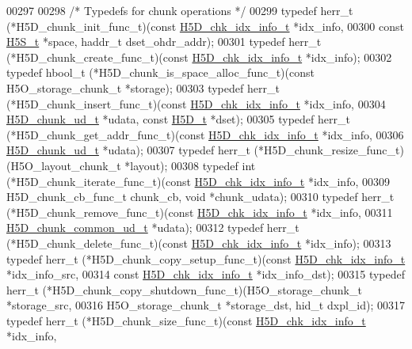 \begin{DoxyCode}
00297 
00298 \textcolor{comment}{/* Typedefs for chunk operations */}
00299 \textcolor{keyword}{typedef} herr\_t (*H5D\_chunk\_init\_func\_t)(\textcolor{keyword}{const} \hyperlink{struct_h5_d__chk__idx__info__t}{H5D\_chk\_idx\_info\_t} *idx\_info,
00300     \textcolor{keyword}{const} \hyperlink{struct_h5_s__t}{H5S\_t} *space, haddr\_t dset\_ohdr\_addr);
00301 \textcolor{keyword}{typedef} herr\_t (*H5D\_chunk\_create\_func\_t)(\textcolor{keyword}{const} \hyperlink{struct_h5_d__chk__idx__info__t}{H5D\_chk\_idx\_info\_t} *idx\_info);
00302 \textcolor{keyword}{typedef} hbool\_t (*H5D\_chunk\_is\_space\_alloc\_func\_t)(\textcolor{keyword}{const} H5O\_storage\_chunk\_t *storage);
00303 \textcolor{keyword}{typedef} herr\_t (*H5D\_chunk\_insert\_func\_t)(\textcolor{keyword}{const} \hyperlink{struct_h5_d__chk__idx__info__t}{H5D\_chk\_idx\_info\_t} *idx\_info,
00304     \hyperlink{struct_h5_d__chunk__ud__t}{H5D\_chunk\_ud\_t} *udata, \textcolor{keyword}{const} \hyperlink{struct_h5_d__t}{H5D\_t} *dset);
00305 \textcolor{keyword}{typedef} herr\_t (*H5D\_chunk\_get\_addr\_func\_t)(\textcolor{keyword}{const} \hyperlink{struct_h5_d__chk__idx__info__t}{H5D\_chk\_idx\_info\_t} *idx\_info,
00306     \hyperlink{struct_h5_d__chunk__ud__t}{H5D\_chunk\_ud\_t} *udata);
00307 \textcolor{keyword}{typedef} herr\_t (*H5D\_chunk\_resize\_func\_t)(H5O\_layout\_chunk\_t *layout);
00308 \textcolor{keyword}{typedef} int (*H5D\_chunk\_iterate\_func\_t)(\textcolor{keyword}{const} \hyperlink{struct_h5_d__chk__idx__info__t}{H5D\_chk\_idx\_info\_t} *idx\_info,
00309     H5D\_chunk\_cb\_func\_t chunk\_cb, \textcolor{keywordtype}{void} *chunk\_udata);
00310 \textcolor{keyword}{typedef} herr\_t (*H5D\_chunk\_remove\_func\_t)(\textcolor{keyword}{const} \hyperlink{struct_h5_d__chk__idx__info__t}{H5D\_chk\_idx\_info\_t} *idx\_info,
00311     \hyperlink{struct_h5_d__chunk__common__ud__t}{H5D\_chunk\_common\_ud\_t} *udata);
00312 \textcolor{keyword}{typedef} herr\_t (*H5D\_chunk\_delete\_func\_t)(\textcolor{keyword}{const} \hyperlink{struct_h5_d__chk__idx__info__t}{H5D\_chk\_idx\_info\_t} *idx\_info);
00313 \textcolor{keyword}{typedef} herr\_t (*H5D\_chunk\_copy\_setup\_func\_t)(\textcolor{keyword}{const} \hyperlink{struct_h5_d__chk__idx__info__t}{H5D\_chk\_idx\_info\_t} *idx\_info\_src,
00314     \textcolor{keyword}{const} \hyperlink{struct_h5_d__chk__idx__info__t}{H5D\_chk\_idx\_info\_t} *idx\_info\_dst);
00315 \textcolor{keyword}{typedef} herr\_t (*H5D\_chunk\_copy\_shutdown\_func\_t)(H5O\_storage\_chunk\_t *storage\_src,
00316     H5O\_storage\_chunk\_t *storage\_dst, hid\_t dxpl\_id);
00317 \textcolor{keyword}{typedef} herr\_t (*H5D\_chunk\_size\_func\_t)(\textcolor{keyword}{const} \hyperlink{struct_h5_d__chk__idx__info__t}{H5D\_chk\_idx\_info\_t} *idx\_info,

\end{DoxyCode}
